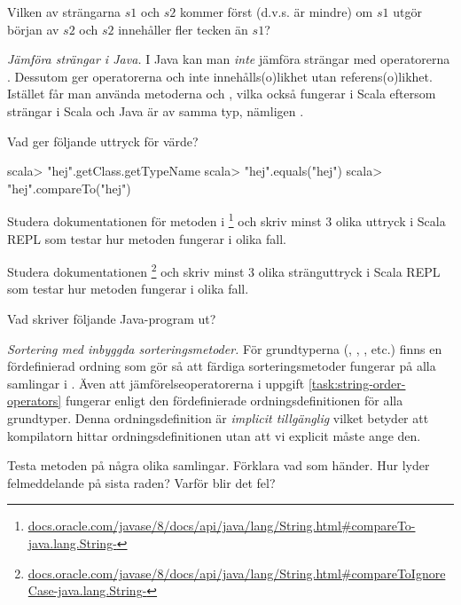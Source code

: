 \Subtask\Pen Vilken av strängarna $s1$ och $s2$ kommer först (d.v.s. är mindre) om $s1$ utgör början av $s2$ och $s2$ innehåller fler tecken än $s1$? 


\Task \emph{Jämföra strängar i Java.} I Java kan man \emph{inte} jämföra strängar med operatorerna \code{< <= > >=}. Dessutom ger operatorerna \code{==} och \code{!=} inte innehålls(o)likhet utan referens(o)likhet. Istället får man använda metoderna  och , vilka också fungerar i Scala eftersom strängar i Scala och Java är av samma typ, nämligen .


\Subtask Vad ger följande uttryck för värde?

\begin{REPL}
scala> "hej".getClass.getTypeName
scala> "hej".equals("hej")
scala> "hej".compareTo("hej")
\end{REPL}


\Subtask Studera dokumentationen för metoden  i \footnote{\href{https://docs.oracle.com/javase/8/docs/api/java/lang/String.html\#compareTo-java.lang.String-}{docs.oracle.com/javase/8/docs/api/java/lang/String.html\#compareTo-java.lang.String-}} och skriv minst 3 olika uttryck i Scala REPL som testar hur metoden fungerar i olika fall. 

\Subtask Studera dokumentationen  \footnote{\href{https://docs.oracle.com/javase/8/docs/api/java/lang/String.html\#compareToIgnoreCase-java.lang.String-}{docs.oracle.com/javase/8/docs/api/java/lang/String.html\#compareToIgnoreCase-java.lang.String-}} och skriv minst 3 olika stränguttryck i Scala REPL som testar hur metoden fungerar i olika fall. 

\Subtask Vad skriver följande Java-program ut?


\Task \emph{Sortering med inbyggda sorteringsmetoder.} För grundtyperna (, , , etc.) finns en fördefinierad ordning som gör så att färdiga sorteringsmetoder fungerar på alla samlingar i . Även att jämförelseoperatorerna i uppgift \ref{task:string-order-operators} fungerar enligt den fördefinierade ordningsdefinitionen för alla grundtyper. Denna ordningsdefinition är \textit{implicit tillgänglig} vilket betyder att kompilatorn hittar ordningsdefinitionen utan att vi explicit måste ange den.

\Subtask Testa metoden  på några olika samlingar. Förklara vad som händer. Hur lyder felmeddelande på sista raden? Varför blir det fel?


